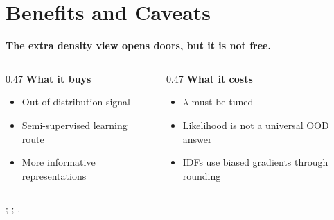 \documentclass[fleqn,compress,utf8,aspectratio=169,t]{beamer}
\makeatletter
\newcommand{\mainclaim}[1]{%
  {\Large\bfseries #1\par}
}
\newcommand{\quietsource}[1]{%
  \vfill{\scriptsize\color{lmu@lightgray}#1\par}
}
\newcommand{\keyword}[1]{\textbf{\color{lmu@green}#1}}
\makeatother
\begin{document}

\section{Benefits and Caveats}
\begin{frame}
  \mainclaim{The extra density view opens doors, but it is not free.}

  \vspace{0.45cm}
  \begin{columns}[T,totalwidth=\textwidth]
    \begin{column}{0.47\textwidth}
      \keyword{What it buys}
      \begin{itemize}
        \item Out-of-distribution signal
        \item Semi-supervised learning route
        \item More informative representations
      \end{itemize}
    \end{column}
    \begin{column}{0.47\textwidth}
      \keyword{What it costs}
      \begin{itemize}
        \item \(\lambda\) must be tuned
        \item Likelihood is not a universal OOD answer
        \item IDFs use biased gradients through rounding
      \end{itemize}
    \end{column}
  \end{columns}

  \quietsource{\textcite{nalisnick2019hybrid}; \textcite{hoogeboom2019integer}; \textcite{tomczak2024deep}.}
\end{frame}

\end{document}
